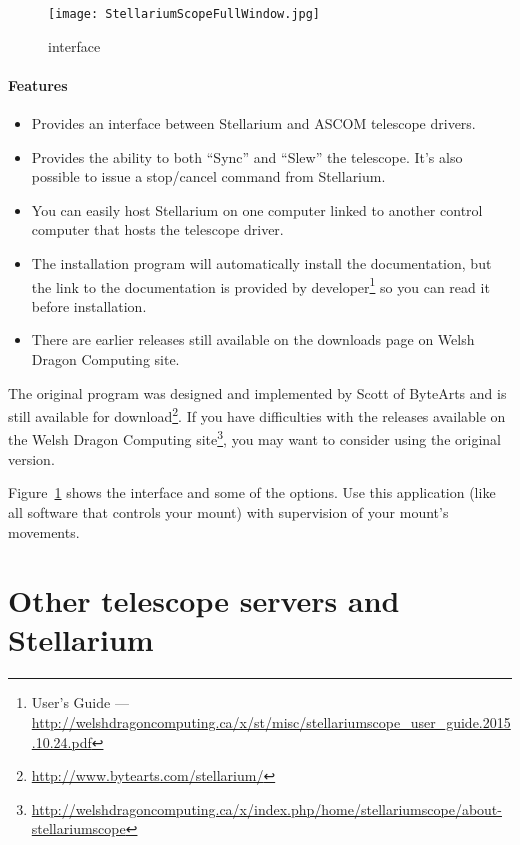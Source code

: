 \begin{figure}[htp]
\begin{center}
\texttt{[image: StellariumScopeFullWindow.jpg]}
\end{center}
\caption{ interface}
\label{fig:StellariumScopeFullWindow}
\end{figure}


\paragraph{Features}
\begin{itemize}
\item Provides an interface between Stellarium and ASCOM telescope drivers.
\item Provides the ability to both ``Sync'' and ``Slew'' the
  telescope. It's also possible to issue a stop/cancel command from
  Stellarium.
\item You can easily host Stellarium on one computer linked to another
  control computer that hosts the telescope driver.
\item The installation program will automatically install the
  documentation, but the link to the documentation is provided
  by developer\footnote{ User's Guide --- \url{http://welshdragoncomputing.ca/x/st/misc/stellariumscope_user_guide.2015.10.24.pdf}} so you can read it before installation.
\item There are earlier releases still available on the downloads page on
  Welsh Dragon Computing site.
\end{itemize}

The original  program was designed and implemented by
Scott of ByteArts and is still available for
download\footnote{\url{http://www.bytearts.com/stellarium/}}. If you
have difficulties with the releases available on the Welsh Dragon
Computing
site\footnote{\url{http://welshdragoncomputing.ca/x/index.php/home/stellariumscope/about-stellariumscope}},
you may want to consider using the original version.


Figure~\ref{fig:StellariumScopeFullWindow} shows the interface and
some of the options.  Use this application (like all software that
controls your mount) with supervision of your mount's movements.

\section{Other telescope servers and Stellarium}
\label{sec:plugins:TelescopeControl:Other}


